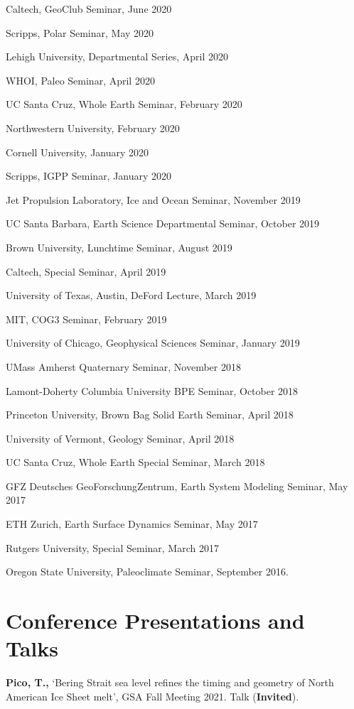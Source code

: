 \documentclass[margin,line]{res}
\begin{document}
\begin{resume}
Caltech, GeoClub Seminar, June 2020

Scripps, Polar Seminar, May 2020

Lehigh University, Departmental Series, April 2020

WHOI, Paleo Seminar, April 2020

UC Santa Cruz, Whole Earth Seminar, February 2020

Northwestern University, February 2020

Cornell University, January 2020

Scripps, IGPP Seminar, January 2020

Jet Propulsion Laboratory, Ice and Ocean Seminar, November 2019

UC Santa Barbara, Earth Science Departmental Seminar, October 2019

Brown University, Lunchtime Seminar, August 2019

Caltech, Special Seminar, April 2019

University of Texas, Austin, DeFord Lecture, March 2019

MIT, COG3 Seminar, February 2019

University of Chicago, Geophysical Sciences Seminar, January 2019

UMass Amherst Quaternary Seminar, November 2018

Lamont-Doherty Columbia University BPE Seminar, October 2018

Princeton University, Brown Bag Solid Earth Seminar, April 2018

University of Vermont, Geology Seminar, April 2018

UC Santa Cruz, Whole Earth Special Seminar, March 2018

GFZ Deutsches GeoForschungZentrum, Earth System Modeling Seminar, May 2017

ETH Zurich, Earth Surface Dynamics Seminar, May 2017

Rutgers University, Special Seminar, March 2017

Oregon State University, Paleoclimate Seminar, September 2016.

\section{\sc Conference Presentations and Talks}

{\bf Pico, T.,} `Bering Strait sea level refines the timing and geometry of North American Ice Sheet melt', GSA Fall Meeting 2021. Talk ({\bf  Invited}). 


\end{resume}
\end{document}
